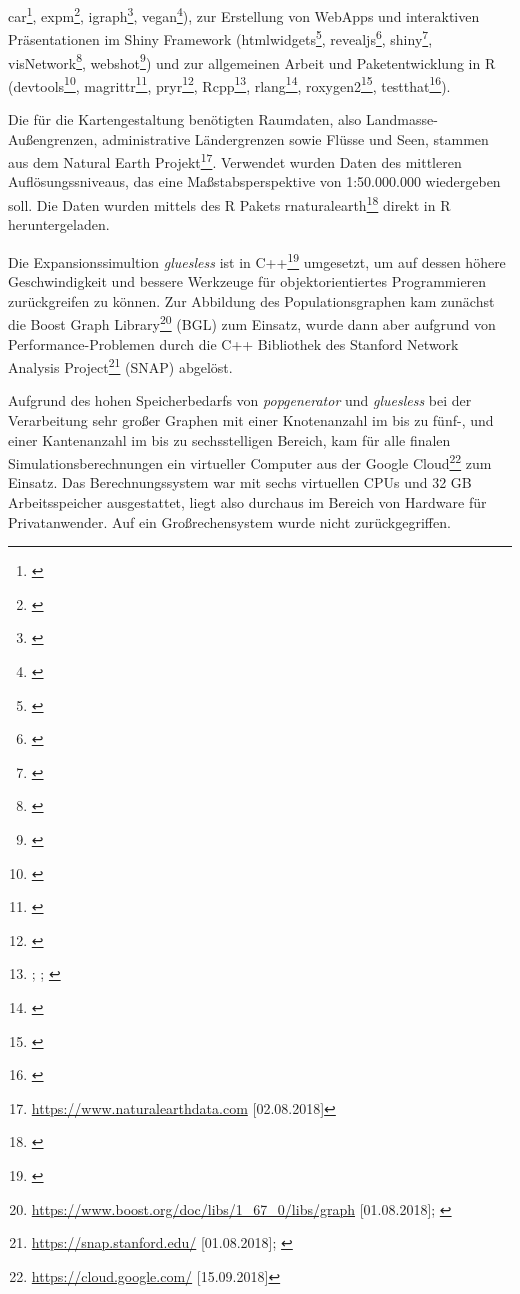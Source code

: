 \documentclass[openany,twoside,twocolumn]{book}
\let\rmarkdownfootnote\footnote%
\def\footnote{\protect\rmarkdownfootnote}
\begin{document}
car\footnote{\textcite{fox_r_2011}}, expm\footnote{\textcite{goulet_expm_2017}},
igraph\footnote{\textcite{csardi_igraph_2006}}, vegan\footnote{\textcite{oksanen_vegan_2018}}),
zur Erstellung von WebApps und interaktiven Präsentationen im Shiny
Framework (htmlwidgets\footnote{\textcite{vaidyanathan_htmlwidgets_2018}},
revealjs\footnote{\textcite{hattab_revealjs_2017}}, shiny\footnote{\textcite{chang_shiny_2018}},
visNetwork\footnote{\textcite{almende_visnetwork_2018}},
webshot\footnote{\textcite{chang_webshot_2018}}) und zur allgemeinen
Arbeit und Paketentwicklung in R (devtools\footnote{\textcite{wickham_devtools_2018}},
magrittr\footnote{\textcite{bache_magrittr_2014}}, pryr\footnote{\textcite{wickham_pryr_2018}},
Rcpp\footnote{\textcite{eddelbuettel_extending_2017};
  \textcite{eddelbuettel_rcpp_2011};
  \textcite{eddelbuettel_seamless_2013}}, rlang\footnote{\textcite{henry_rlang_2018}},
roxygen2\footnote{\textcite{wickham_roxygen2_2017}}, testthat\footnote{\textcite{wickham_testthat_2011}}).

Die für die Kartengestaltung benötigten Raumdaten, also
Landmasse-Außengrenzen, administrative Ländergrenzen sowie Flüsse und
Seen, stammen aus dem Natural Earth Projekt\footnote{\url{https://www.naturalearthdata.com}
  {[}02.08.2018{]}}. Verwendet wurden Daten des mittleren
Auflösungssniveaus, das eine Maßstabsperspektive von 1:50.000.000
wiedergeben soll. Die Daten wurden mittels des R Pakets
rnaturalearth\footnote{\textcite{south_rnaturalearth_2017}} direkt in R
heruntergeladen.

Die Expansionssimultion \emph{gluesless} ist in C++\footnote{\textcite{standard-cpp-foundation_international_2017}}
umgesetzt, um auf dessen höhere Geschwindigkeit und bessere Werkzeuge
für objektorientiertes Programmieren zurückgreifen zu können. Zur
Abbildung des Populationsgraphen kam zunächst die Boost Graph
Library\footnote{\url{https://www.boost.org/doc/libs/1_67_0/libs/graph}
  {[}01.08.2018{]}; \textcite{siek_boost_2002}} (BGL) zum Einsatz, wurde
dann aber aufgrund von Performance-Problemen durch die C++ Bibliothek
des Stanford Network Analysis Project\footnote{\url{https://snap.stanford.edu/}
  {[}01.08.2018{]}; \textcite{leskovec2016snap}} (SNAP) abgelöst.

Aufgrund des hohen Speicherbedarfs von \emph{popgenerator} und
\emph{gluesless} bei der Verarbeitung sehr großer Graphen mit einer
Knotenanzahl im bis zu fünf-, und einer Kantenanzahl im bis zu
sechsstelligen Bereich, kam für alle finalen Simulationsberechnungen ein
virtueller Computer aus der Google Cloud\footnote{\url{https://cloud.google.com/}
  {[}15.09.2018{]}} zum Einsatz. Das Berechnungssystem war mit sechs
virtuellen CPUs und 32 GB Arbeitsspeicher ausgestattet, liegt also
durchaus im Bereich von Hardware für Privatanwender. Auf ein
Großrechensystem wurde nicht zurückgegriffen.
\end{document}
